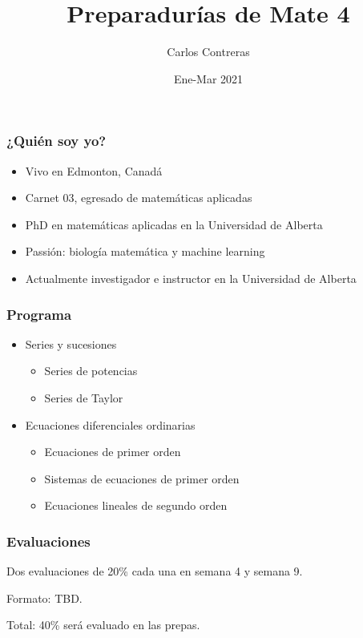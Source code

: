 \documentclass{beamer}
\title{Preparadurías de Mate 4}
\institute{Universidad Simón Bolívar}
\author[Contreras]{Carlos Contreras }
\date{Ene-Mar 2021}
\begin{document}

\begin{frame}
     \thispagestyle{empty}
     \titlepage
\end{frame}
\begin{frame}
\frametitle{¿Quién soy yo?}

\begin{itemize}
 \item Vivo en Edmonton, Canadá
 \item Carnet 03, egresado de matemáticas aplicadas
 \item PhD en matemáticas aplicadas en la Universidad de Alberta
 \item Passión: biología matemática y machine learning
 \item Actualmente investigador e instructor en la Universidad de Alberta
\end{itemize}


\end{frame}
\begin{frame}
\frametitle{Programa}
\begin{itemize}
 \item Series y sucesiones
 \begin{itemize}
  \item Series de potencias
  \item Series de Taylor
 \end{itemize}
 \item Ecuaciones diferenciales ordinarias
 \begin{itemize}
  \item Ecuaciones de primer orden
  \item Sistemas de ecuaciones de primer orden
  \item Ecuaciones lineales de segundo orden
 \end{itemize}
\end{itemize}
\end{frame}
\begin{frame}
\frametitle{Evaluaciones}
Dos evaluaciones de 20\% cada una en semana 4 y semana 9.

\vspace{10pt}
Formato: TBD.

\vspace{10pt}
Total: 40\% será evaluado en las prepas.
\end{frame}
\end{document}
